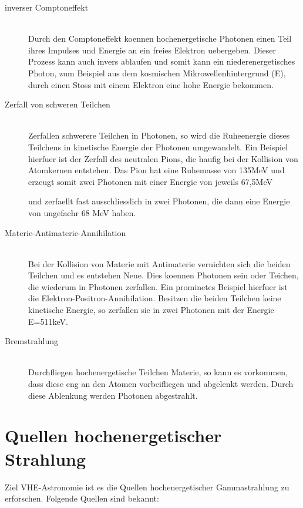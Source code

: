 \begin{description}
\item[inverser Comptoneffekt]\hfill \\
Durch den Comptoneffekt koennen hochenergetische Photonen einen Teil ihres Impulses und Energie an ein freies Elektron uebergeben. Dieser Prozess kann auch invers ablaufen und somit kann ein niederenergetisches Photon, zum Beispiel aus dem kosmischen Mikrowellenhintergrund (E), durch einen Stoss mit einem Elektron eine hohe Energie bekommen.
\item[Zerfall von schweren Teilchen]\hfill \\ 
Zerfallen schwerere Teilchen in Photonen, so wird die Ruheenergie dieses Teilchens in kinetische Energie der Photonen umgewandelt. Ein Beispiel hierfuer ist der Zerfall des neutralen Pions, die haufig bei der Kollision von Atomkernen entstehen. Das Pion hat eine Ruhemasse von 135MeV \cite{PDG} und erzeugt somit zwei Photonen mit einer Energie von jeweils 67,5MeV

und zerfaellt fast ausschliesslich in zwei Photonen, die dann eine Energie von ungefaehr 68 MeV haben.
\item[Materie-Antimaterie-Annihilation]\hfill \\
Bei der Kollision von Materie mit Antimaterie vernichten sich die beiden Teilchen und es entstehen Neue. Dies koennen Photonen sein oder Teichen, die wiederum in Photonen zerfallen. Ein prominetes Beispiel hierfuer ist die Elektron-Positron-Annihilation. Besitzen die beiden Teilchen keine kinetische Energie, so zerfallen sie in zwei Photonen mit der Energie E=511keV.
\item[Bremstrahlung]\hfill \\
Durchfliegen hochenergetische Teilchen Materie, so kann es vorkommen, dass diese eng an den Atomen vorbeifliegen und abgelenkt werden. Durch diese Ablenkung werden Photonen abgestrahlt.
\end{description}

\section{Quellen hochenergetischer Strahlung}
Ziel VHE-Astronomie ist es die Quellen hochenergetischer Gammastrahlung zu erforschen. Folgende Quellen sind bekannt:

